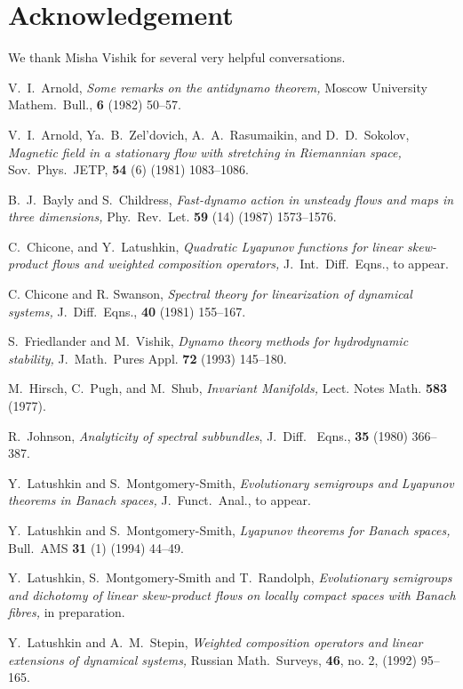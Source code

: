 \section{Acknowledgement}
We thank Misha Vishik for several very helpful conversations.
\begin{thebibliography}{99}

 V.~I.~Arnold,
{\em Some remarks on the antidynamo theorem,}
Moscow University Mathem.~Bull., {\bf 6} (1982) 50--57.

 V.~I.~Arnold, Ya.~B.~Zel'dovich, A.~A.~Rasumaikin, and
D.~D.~Sokolov, {\em Magnetic field in a stationary flow with
stretching in Riemannian space,} Sov.~Phys.~JETP, {\bf 54} (6)
(1981) 1083--1086.

 B.~J.~Bayly and S.~Childress,
{\em Fast-dynamo action in unsteady flows and maps in three
dimensions,}
Phy.~Rev.~Let. {\bf 59} (14) (1987) 1573--1576.

 C.~Chicone, and Y.~Latushkin,
{\em Quadratic Lyapunov functions for linear skew-product flows and weighted
composition operators,}
J.~Int.~Diff.~Eqns., to appear.

 C. Chicone and R. Swanson,
{\em Spectral theory for linearization of dynamical systems,}
J.~Diff.~Eqns.,  {\bf 40} (1981) 155--167.

 S.~Friedlander and M.~Vishik,
{\em Dynamo theory methods for hydrodynamic stability,}
J.~Math.~Pures Appl. {\bf 72} (1993) 145--180.

 M.~Hirsch, C.~Pugh, and M.~Shub,
{\em Invariant Manifolds,}
Lect. Notes Math. {\bf 583} (1977).

 R.~Johnson,
{\em Analyticity of spectral subbundles},
J.~Diff.~ Eqns., {\bf 35} (1980) 366--387.

 Y.~Latushkin and S.~Montgomery-Smith,
{\em Evolutionary semigroups and Lyapunov theorems in Banach spaces,}
J.~Funct.~Anal., to appear.


 Y.~Latushkin and S.~Montgomery-Smith,
{\em Lyapunov theorems for Banach spaces,}
Bull.~AMS {\bf 31} (1) (1994) 44--49.


 Y.~Latushkin, S.~Montgomery-Smith and T.~Randolph,
{\em Evolutionary semigroups and dichotomy of linear skew-product
flows on locally compact spaces with Banach fibres,} in preparation.

 Y.~Latushkin and A.~M.~Stepin,
{\em Weighted composition
operators and linear extensions of dynamical systems,}
Russian Math.~Surveys, {\bf 46}, no. 2, (1992) 95--165.


\end{thebibliography}

